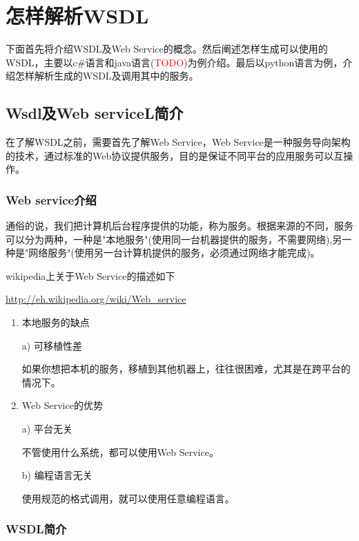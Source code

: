 
\chapter{怎样解析WSDL}
\label{chap01}

下面首先将介绍WSDL及Web Service的概念。然后阐述怎样生成可以使用的WSDL，主要以c\#语言和java语言(\textcolor{red}{TODO})为例介绍。最后以python语言为例，介绍怎样解析生成的WSDL及调用其中的服务。

\section{Wsdl及Web serviceL简介}

在了解WSDL之前，需要首先了解Web Service，Web Service是一种服务导向架构的技术，通过标准的Web协议提供服务，目的是保证不同平台的应用服务可以互操作。

\subsection{Web service介绍}
通俗的说，我们把计算机后台程序提供的功能，称为服务。根据来源的不同，服务可以分为两种，一种是"本地服务"(使用同一台机器提供的服务，不需要网络),另一种是"网络服务"(使用另一台计算机提供的服务，必须通过网络才能完成)。

wikipedia上关于Web Service的描述如下

\url{http://eh.wikipedia.org/wiki/Web_service}

\begin{enumerate}

\item 本地服务的缺点

a) 可移植性差

如果你想把本机的服务，移植到其他机器上，往往很困难，尤其是在跨平台的情况下。

\item Web Service的优势

a) 平台无关

不管使用什么系统，都可以使用Web Service。

b) 编程语言无关

使用规范的格式调用，就可以使用任意编程语言。
\end{enumerate}

\subsection{WSDL简介}


